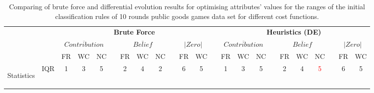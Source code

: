 \begin{landscape}
    \begin{table}[!h]
        
        \small
        \centering
        
        \caption{Comparing of brute force and differential evolution results for optimising attributes' values for the ranges of the initial classification rules of 10 rounds public goods games data set for different cost functions.}
        \label{tab:bestPGG10DataSets_BF_DE}
        \begin{tabular}{@{}crccccccccccccccccccccc@{}}
            \toprule
            
            & & \multicolumn{10}{c}{\textbf{Brute Force}}
            &  \phantom{abc} &
            \multicolumn{10}{c}{\textbf{Heuristics (DE)}}
            \\
            \cmidrule{3-12} \cmidrule{14-23}
            
            &    & \multicolumn{3}{c}{\textbf{$\overline{Contribution}$}} &  \phantom{a}& \multicolumn{3}{c}{\textbf{$\overline{Belief}$}} &  \phantom{a}& \multicolumn{2}{c}{\textbf{$\left |Zero\right |$}}
            
            &  \phantom{abc}&
            \multicolumn{3}{c}{\textbf{$\overline{Contribution}$}} &  \phantom{a}& \multicolumn{3}{c}{\textbf{$\overline{Belief}$}} &  \phantom{a}& \multicolumn{2}{c}{\textbf{$\left |Zero\right |$}} \\
            
            \cmidrule{3-5} \cmidrule{7-9} \cmidrule{11-12} \cmidrule{14-16} \cmidrule{18-20}  \cmidrule{22-23}
            
            &    & FR  & WC  & NC & \phantom{a} & FR & WC& NC & \phantom{a}& FR & WC  
            &  \phantom{abc}& 
            FR  & WC  & NC & \phantom{a} & FR & WC& NC & \phantom{a}& FR & WC
            \\ \midrule
            \multirow{2}{*}{\begin{turn}{90}{\scriptsize Statistics}\end{turn}}    
            & IQR & 
            1    & 3   & 5 & \phantom{a}           
            & 2  & 4   & 2 & \phantom{a}        
            & 6   & 5                         
            & \phantom{a} &
            1    & 3   & 5 & \phantom{a}           
            & 2  & 4   & \textcolor{red}{5} & \phantom{a}        
            & 6   & 5                         \\
            

\end{tabular}
\end{table}
\end{landscape}
